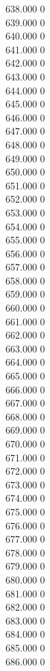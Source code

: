 { 638.000	0 \\
 639.000	0 \\
 640.000	0 \\
 641.000	0 \\
 642.000	0 \\
 643.000	0 \\
 644.000	0 \\
 645.000	0 \\
 646.000	0 \\
 647.000	0 \\
 648.000	0 \\
 649.000	0 \\
 650.000	0 \\
 651.000	0 \\
 652.000	0 \\
 653.000	0 \\
 654.000	0 \\
 655.000	0 \\
 656.000	0 \\
 657.000	0 \\
 658.000	0 \\
 659.000	0 \\
 660.000	0 \\
 661.000	0 \\
 662.000	0 \\
 663.000	0 \\
 664.000	0 \\
 665.000	0 \\
 666.000	0 \\
 667.000	0 \\
 668.000	0 \\
 669.000	0 \\
 670.000	0 \\
 671.000	0 \\
 672.000	0 \\
 673.000	0 \\
 674.000	0 \\
 675.000	0 \\
 676.000	0 \\
 677.000	0 \\
 678.000	0 \\
 679.000	0 \\
 680.000	0 \\
 681.000	0 \\
 682.000	0 \\
 683.000	0 \\
 684.000	0 \\
 685.000	0 \\
 686.000	0 \\
}
